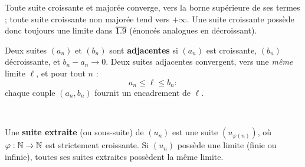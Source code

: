 
\begin{theoreme}
Toute suite croissante et majorée converge, vers la borne supérieure de ses
termes ; toute suite croissante non majorée tend vers $+\infty$. Une suite
croissante possède donc toujours une limite dans $\overline{1.9}$ (énoncés
analogues en décroissant).
\end{theoreme}

\noindent
\begin{minipage}[c]{0.52\linewidth}
\begin{theoreme}
Deux suites $(a_n)$ et $(b_n)$ sont \textbf{adjacentes} si $(a_n)$ est
croissante, $(b_n)$ décroissante, et $b_n-a_n\to0$. Deux suites adjacentes
convergent, vers une \emph{même} limite $\ell$, et pour tout $n$ :
\[
  a_n\leq\ell\leq b_n :
\]
chaque couple $(a_n,b_n)$ fournit un encadrement de $\ell$.
\end{theoreme}
\end{minipage}\hfill
\begin{minipage}[c]{0.44\linewidth}
\centering
{}\\[0.5mm]
\end{minipage}


\begin{definition}
Une \textbf{suite extraite} (ou sous-suite) de $(u_n)$ est une suite
$(u_{\varphi(n)})$, où $\varphi:\mathbb{N}\to\mathbb{N}$ est strictement croissante.
Si $(u_n)$ possède une limite (finie ou infinie), toutes ses suites
extraites possèdent la même limite.
\end{definition}

